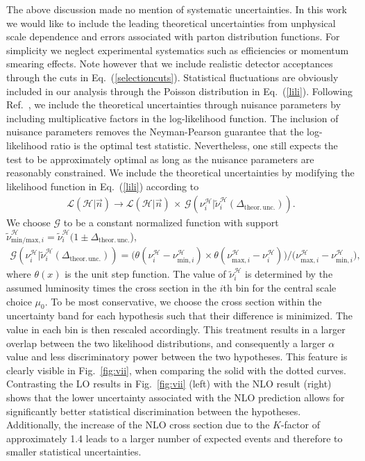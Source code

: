 \documentclass{JHEP3}
\newcommand{\be}{\begin{eqnarray}}
\newcommand{\ee}{\end{eqnarray}}
\begin{document}
The above discussion made no mention of systematic uncertainties.
In this work we would like to include the leading theoretical uncertainties from unphysical scale dependence and errors associated with parton distribution functions.
For simplicity we neglect experimental systematics such as efficiencies or momentum smearing effects.
Note however that we include realistic detector acceptances through the cuts in Eq.~(\ref{selectioncuts}).
Statistical fluctuations are obviously included in our analysis through the Poisson distribution in Eq.~(\ref{lili}).
Following Ref.~\cite{Conway:2011in}, we include the theoretical uncertainties through nuisance parameters by including multiplicative factors in the log-likelihood function.
The inclusion of nuisance parameters removes the Neyman-Pearson guarantee that the log-likelihood ratio is the optimal test statistic.
Nevertheless, one still expects the test to be approximately optimal as long as the nuisance parameters are reasonably constrained.
We include the theoretical uncertainties by modifying the likelihood function in Eq.~(\ref{lili}) according to
\be
  \label{errorfunctG}
  \mathcal{L}(\mathcal{H}|\vec{n}) \to \mathcal{L}(\mathcal{H}|\vec{n})  \,\times\, \mathcal{G} \left( \nu_i^\mathcal{H} | \tilde{\nu}_i^\mathcal{H}(\Delta_\mathrm{theor.\,unc.}) \right).
\ee
We choose $\mathcal{G}$ to be a constant normalized function with support $\tilde{\nu}_{\mathrm{min/max},i}^\mathcal{H} = \tilde{\nu}_i^\mathcal{H}(1 \pm \Delta_\mathrm{theor.\,unc.}$),
\be
\label{uniuncert}
  \mathcal{G} \left( \nu_i^\mathcal{H} | \tilde{\nu}_i^\mathcal{H}(\Delta_\mathrm{theor.\,unc.}) \right) = 
  \big( \theta\left( {\nu}_i^\mathcal{H} - \nu_{\mathrm{min},i}^\mathcal{H}  \right) 
      \times  \theta\left( \nu_{\mathrm{max},i}^\mathcal{H} - {\nu}_i^\mathcal{H} \right)  \big) 
  \big/ \big( \nu_{\mathrm{max},i}^\mathcal{H} - \nu_{\mathrm{min},i}^\mathcal{H}  \big),
\ee
where $\theta(x)$ is the unit step function.
The value of $\tilde{\nu}_i^\mathcal{H}$ is determined by the assumed luminosity times the cross section in the $i$th bin 
for the central scale choice $\mu_0$.
To be most conservative, we choose the cross section within the uncertainty band for each hypothesis such that their difference is minimized. 
The value in each bin is then rescaled accordingly.
This treatment results in a larger overlap between the two likelihood distributions, 
and consequently a larger $\alpha$ value and less discriminatory power between the two hypotheses. 
This feature is clearly visible in Fig.~\ref{fig:vii}, when comparing the solid with the dotted curves. 
Contrasting the LO results in Fig.~\ref{fig:vii} (left) with the NLO result (right) shows that 
the lower uncertainty associated with the NLO prediction allows for significantly better statistical discrimination between the hypotheses.
Additionally, the increase of the NLO cross section due to the $K$-factor of approximately 1.4 leads to a larger number of expected events and therefore 
to smaller statistical uncertainties.
\end{document}
